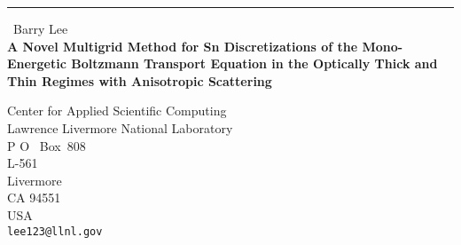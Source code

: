 \documentclass{report}
\begin{document}
\begin{center}
\rule{6in}{1pt} \
{\large Barry Lee \\
{\bf A Novel Multigrid Method for Sn Discretizations of the Mono-Energetic Boltzmann Transport Equation in the Optically Thick and Thin Regimes with Anisotropic Scattering}}

Center for Applied Scientific Computing \\ Lawrence Livermore National Laboratory \\ P O ~Box~808 \\ L-561 \\ Livermore \\ CA 94551 \\ USA
\\
{\tt lee123@llnl.gov}\end{center}

\end{document}
